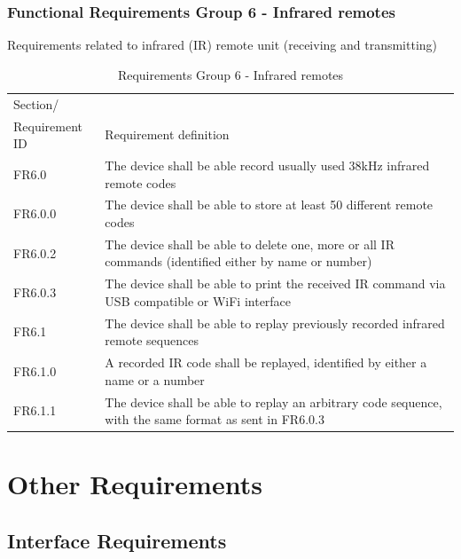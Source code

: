\documentclass[]{scrreprt}%
\newcommand{\note}[1]{\textcolor{black!50}{\textit{Note: #1}}}
\begin{document}
\subsection{Functional Requirements Group 6 - Infrared remotes}

Requirements related to infrared (IR) remote unit (receiving and transmitting)

\begin{table}[htb!]
 \centering
 \caption{Requirements Group 6 - Infrared remotes}
\label{req_group6}
 \begin{tabularx}{\textwidth}{|l|X|} \hline
 Section/\\ Requirement ID & Requirement definition\\ \hline  \hline
 FR6.0 & The device shall be able record usually used 38kHz infrared remote codes \\ \hline
 FR6.0.0 & The device shall be able to store at least 50 different remote codes \\ \hline 
 FR6.0.2 & The device shall be able to delete one, more or all IR commands (identified either by name or number) \\ \hline
 FR6.0.3 & The device shall be able to print the received IR command via USB compatible or WiFi interface \\ \hline
 FR6.1 & The device shall be able to replay previously recorded infrared remote sequences \\ \hline
 FR6.1.0 & A recorded IR code shall be replayed, identified by either a name or a number \\ \hline
 FR6.1.1 & The device shall be able to replay an arbitrary code sequence, with the same format as sent in FR6.0.3 \\ \hline
 \end{tabularx}
\end{table}



\chapter{Other Requirements}


\section{Interface Requirements}
\end{document}
